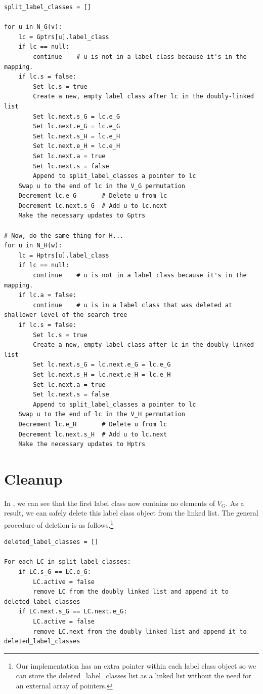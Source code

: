 {
\scriptsize
\begin{verbatim}
split_label_classes = []

for u in N_G(v):
    lc = Gptrs[u].label_class
    if lc == null:
        continue    # u is not in a label class because it's in the mapping.
    if lc.s = false:
        Set lc.s = true
        Create a new, empty label class after lc in the doubly-linked list
        Set lc.next.s_G = lc.e_G
        Set lc.next.e_G = lc.e_G
        Set lc.next.s_H = lc.e_H
        Set lc.next.e_H = lc.e_H
        Set lc.next.a = true
        Set lc.next.s = false
        Append to split_label_classes a pointer to lc
    Swap u to the end of lc in the V_G permutation
    Decrement lc.e_G       # Delete u from lc
    Decrement lc.next.s_G  # Add u to lc.next
    Make the necessary updates to Gptrs
        
# Now, do the same thing for H...
for u in N_H(w):
    lc = Hptrs[u].label_class
    if lc == null:
        continue    # u is not in a label class because it's in the mapping.
    if lc.a = false:
        continue    # u is in a label class that was deleted at shallower level of the search tree
    if lc.s = false:
        Set lc.s = true
        Create a new, empty label class after lc in the doubly-linked list
        Set lc.next.s_G = lc.next.e_G = lc.e_G
        Set lc.next.s_H = lc.next.e_H = lc.e_H
        Set lc.next.a = true
        Set lc.next.s = false
        Append to split_label_classes a pointer to lc
    Swap u to the end of lc in the V_H permutation
    Decrement lc.e_H       # Delete u from lc
    Decrement lc.next.s_H  # Add u to lc.next
    Make the necessary updates to Hptrs
\end{verbatim}
}

\section{Cleanup}

In , we can see that the first label class
now contains no elements of $V_G$.  As a result, we can safely delete this label
class object from the linked list.  The general procedure of deletion is as
follows.\footnote{Our implementation has an extra pointer within each label
class object so we can store the deleted\_label\_classes list as a linked list
without the need for an external array of pointers.}

{
\scriptsize
\begin{verbatim}
deleted_label_classes = []

For each LC in split_label_classes:
    if LC.s_G == LC.e_G:
        LC.active = false
        remove LC from the doubly linked list and append it to deleted_label_classes
    if LC.next.s_G == LC.next.e_G:
        LC.active = false
        remove LC.next from the doubly linked list and append it to deleted_label_classes
\end{verbatim}
}


